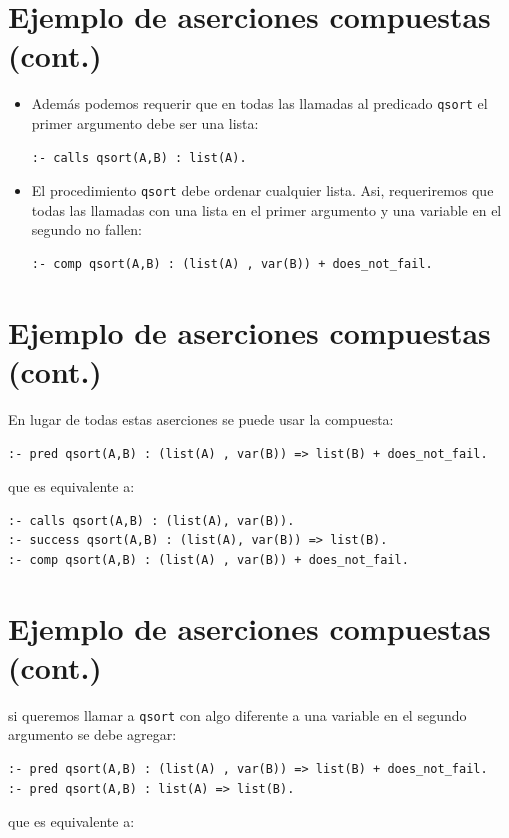 \documentclass[11pt]{article}
\begin{document}
\section*{Ejemplo de aserciones compuestas (cont.)}
\label{sec:orgb0a9142}
\begin{itemize}
\item Además podemos requerir que en todas las llamadas al predicado
\texttt{qsort} el primer argumento debe ser una lista:

\begin{verbatim}
:- calls qsort(A,B) : list(A).
\end{verbatim}

\item El procedimiento \texttt{qsort} debe ordenar cualquier lista. Asi,
requeriremos que todas las llamadas con una lista en el primer
argumento y una variable en el segundo no fallen:

\begin{verbatim}
:- comp qsort(A,B) : (list(A) , var(B)) + does_not_fail.
\end{verbatim}
\end{itemize}

\section*{Ejemplo de aserciones compuestas (cont.)}
\label{sec:orged019e6}

En lugar de todas estas aserciones se puede usar la compuesta:

\begin{verbatim}
:- pred qsort(A,B) : (list(A) , var(B)) => list(B) + does_not_fail.
\end{verbatim}
que es equivalente a: 

\begin{verbatim}
:- calls qsort(A,B) : (list(A), var(B)).
:- success qsort(A,B) : (list(A), var(B)) => list(B).
:- comp qsort(A,B) : (list(A) , var(B)) + does_not_fail.
\end{verbatim}

\section*{Ejemplo de aserciones compuestas (cont.)}
\label{sec:org104df81}

si queremos llamar a \texttt{qsort} con algo diferente a una variable en el
segundo argumento se debe agregar:

\begin{verbatim}
:- pred qsort(A,B) : (list(A) , var(B)) => list(B) + does_not_fail.
:- pred qsort(A,B) : list(A) => list(B).
\end{verbatim}
que es equivalente a: 
\end{document}
